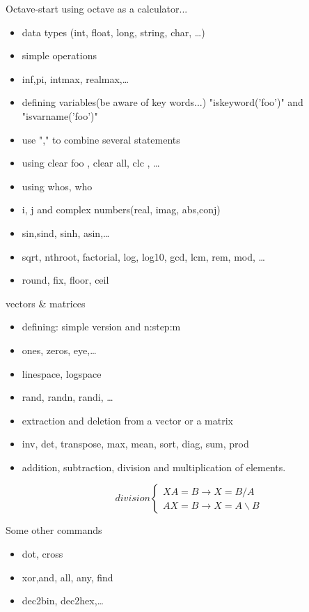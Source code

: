 \documentclass{beamer}
\begin{document}
	\begin{frame}{Octave-start}
		using octave as a calculator...
		\begin{itemize}
			\item data types (int, float, long, string, char, \dots)
			\item simple operations
			\item inf,pi, intmax, realmax,\dots
			\item defining variables(be aware of key words...) "iskeyword('foo')" and "isvarname('foo')"
			\item use "," to combine several statements
			\item using clear foo , clear all, clc , \dots
			\item using whos, who
			\item i, j and complex numbers(real, imag, abs,conj)
			\item sin,sind, sinh, asin,\dots
			\item sqrt, nthroot, factorial, log, log10, gcd, lcm, rem, mod, \dots
			\item round, fix, floor, ceil
			
		\end{itemize}
	\end{frame}
	
	\begin{frame}{vectors \& matrices}
		\begin{itemize}
			\item defining: simple version and n:step:m
			\item ones, zeros, eye,\dots
			\item linespace, logspace
			\item rand, randn, randi, \dots
			\item extraction and deletion from a vector or a matrix
			\item inv, det, transpose, max, mean, sort, diag, sum, prod
			\item addition, subtraction, division and multiplication of elements.
			
			\[
			division
				\begin{cases}
					XA=B \rightarrow X=B/A \\
					AX=B \rightarrow X=A\backslash B
					
				\end{cases}
			\]
		\end{itemize}
		\end{frame}
		
		\begin{frame}{Some other commands}
			\begin{itemize}
				\item dot, cross
				\item xor,and, all, any, find
				\item dec2bin, dec2hex,\dots
				
			\end{itemize}
		\end{frame}
		
\end{document}
